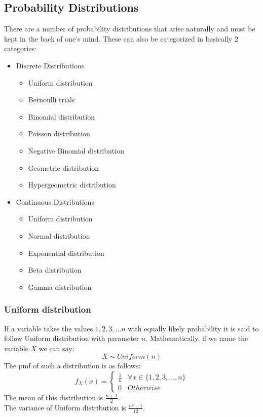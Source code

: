 \documentclass[11pt,letterpaper]{article}
\begin{document}
\subsection{Probability Distributions}
There are a number of probability distributions that arise naturally and must
be kept in the back of one's mind. These can also be categorized in basically 
2 categories:
\begin{itemize}
  \item Discrete Distributions
    \begin{itemize}
      \item Uniform distribution
      \item Bernoulli trials
      \item Binomial distribution
      \item Poisson distribution
      \item Negative Binomial distribution
      \item Geometric distribution
      \item Hypergeometric distribution
    \end{itemize}
  \item Continuous Distributions
    \begin{itemize}
      \item Uniform distribution
      \item Normal distribution
      \item Exponential distribution
      \item Beta distribution 
      \item Gamma distribution
    \end{itemize}
\end{itemize}

\subsubsection{Uniform distribution}
If a variable takes the values $1, 2, 3, \dots n$ with equally likely probability
it is said to follow Uniform distribution with parameter $n$. Mathematically, if 
we name the variable $X$ we can say:
\[
  X \sim Uniform(n) 
\]
The pmf of such a distribution is as follows: 
\[
  f_X(x) = \begin{cases} \frac{1}{n} & \forall x \in \{1, 2, 3, \dots, n\}\\
  0 & Otherwise
  \end{cases}
\]
The mean of this distribution is $\frac{n+1}{2}$.\\
The variance of Uniform distribution is $\frac{n^2-1}{12}$. 
\end{document}
